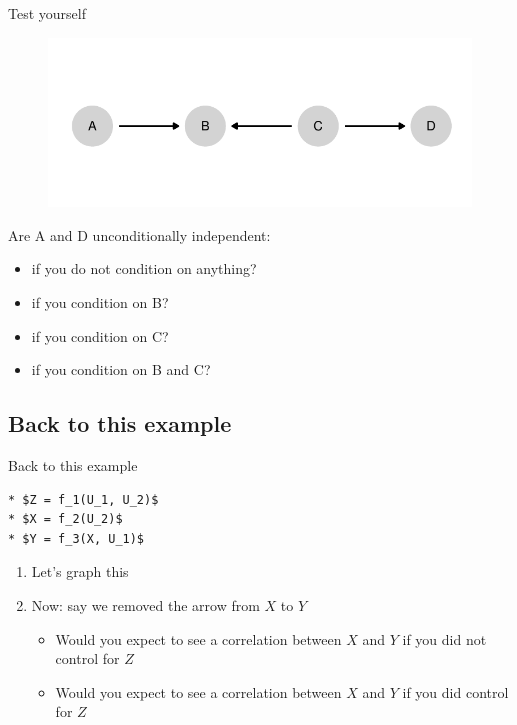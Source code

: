 \documentclass[
  11pt,
  ignorenonframetext,
]{beamer}
\providecommand{\tightlist}{%
  \setlength{\itemsep}{0pt}\setlength{\parskip}{0pt}}\usepackage{longtable,booktabs,array}
\begin{document}
\begin{frame}{Test yourself}
\begin{figure}

{\centering \includegraphics{2.1_causality_files/figure-beamer/unnamed-chunk-7-1.pdf}

}

\end{figure}

Are A and D unconditionally independent:

\begin{itemize}
\tightlist
\item
  if you do not condition on anything?
\item
  if you condition on B?
\item
  if you condition on C?
\item
  if you condition on B and C?
\end{itemize}
\end{frame}

\hypertarget{back-to-this-example}{%
\subsection{Back to this example}\label{back-to-this-example}}

\begin{frame}[fragile]{Back to this example}
\begin{verbatim}
* $Z = f_1(U_1, U_2)$
* $X = f_2(U_2)$
* $Y = f_3(X, U_1)$
\end{verbatim}

\begin{enumerate}
\tightlist
\item
  Let's graph this
\item
  Now: say we removed the arrow from \(X\) to \(Y\)

  \begin{itemize}
  \tightlist
  \item
    Would you expect to see a correlation between \(X\) and \(Y\) if you
    did not control for \(Z\)
  \item
    Would you expect to see a correlation between \(X\) and \(Y\) if you
    did control for \(Z\)
  \end{itemize}
\end{enumerate}
\end{frame}
\end{document}
